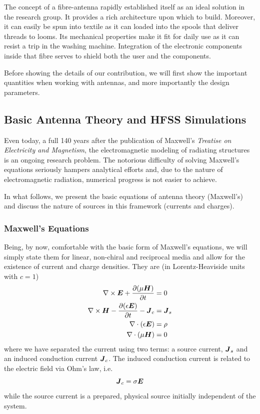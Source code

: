 The concept of a fibre-antenna rapidly established itself
as an ideal solution in the research group. It provides a rich
architecture upon which to build. Moreover, it can easily 
be spun into textile as it can loaded into the spools that 
deliver threads to looms. Its mechanical properties make it
fit for daily use as it can resist a trip in the washing machine. 
Integration of the electronic components inside that fibre 
serves to shield both the user and the components. 

Before showing the details of our contribution, 
we will first show the important quantities when
working with antennas, and more importantly the design
parameters.

\subsection{Basic Antenna Theory and HFSS Simulations}
Even today, a full 140 years after the publication of 
Maxwell's \textit{Treatise on Electricity and Magnetism}, 
the electromagnetic modeling of radiating structures 
is an ongoing research problem. The notorious difficulty 
of solving Maxwell's equations seriously hampers analytical efforts
and, due to the nature of electromagnetic radiation, numerical
progress is not easier to achieve.

In what follows, we present the basic equations of 
antenna theory (Maxwell's) and discuss the nature 
of sources in this framework (currents and charges). 

\subsubsection{Maxwell's Equations}
Being, by now, comfortable with the basic form of Maxwell's equations, 
we will simply state them for linear, non-chiral and reciprocal media
and allow for the existence of current and charge densities. 
They are (in Lorentz-Heaviside units with $c=1$) \cite{NOV2012}
  \begin{subequations}
  \begin{align}
   \nabla\times\boldsymbol{E}+\frac{\partial(\mu\boldsymbol{H})}{\partial t}	&=0	\\
   \nabla\times\boldsymbol{H}-\frac{\partial(\epsilon\boldsymbol{E})}{\partial t}-\boldsymbol{J}_c&=\boldsymbol{J}_s\\
   \nabla\cdot(\epsilon\boldsymbol{E})					&=\rho	\\
   \nabla\cdot(\mu\boldsymbol{H})					&=0
  \end{align}
  \end{subequations}
where we have separated the current using two terms: a source current, $\boldsymbol{J}_s$ and
an induced conduction current $\boldsymbol{J}_c$. The induced conduction current
is related to the electric field via Ohm's law, i.e.
  \begin{equation}
   \boldsymbol{J}_c=\sigma\boldsymbol{E}
  \end{equation}
while the source current is a prepared, physical source initially 
independent of the system.


